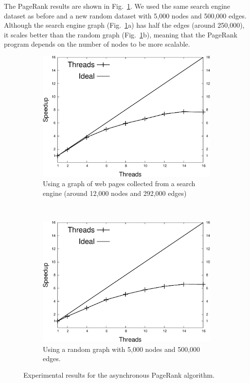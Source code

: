 The PageRank results are shown in Fig.~\ref{exp:pagerank}. We used the same search engine dataset as before and a new random dataset with 5,000 nodes and 500,000 edges. Although the search engine graph (Fig.~\ref{exp:pagerank}a) has half the edges (around 250,000), it scales better than the random graph (Fig.~\ref{exp:pagerank}b), meaning that the PageRank program depends on the number of nodes to be more scalable.

\begin{figure}[ht]
   \centering
   \begin{subfigure}[b]{\plotsize}
      \includegraphics[width=\textwidth]{speedup_pagerank-search_engines.pdf}
      \caption{Using a graph of web pages collected from a search engine (around 12,000 nodes and 292,000 edges)}
   \end{subfigure}
   ~~
   \begin{subfigure}[b]{\plotsize}
      \includegraphics[width=\textwidth]{speedup_pagerank-5000.pdf}
      \caption{Using a random graph with 5,000 nodes and 500,000 edges.}
   \end{subfigure}
   \caption{Experimental results for the asynchronous PageRank algorithm.}
   \label{exp:pagerank}
\end{figure}

